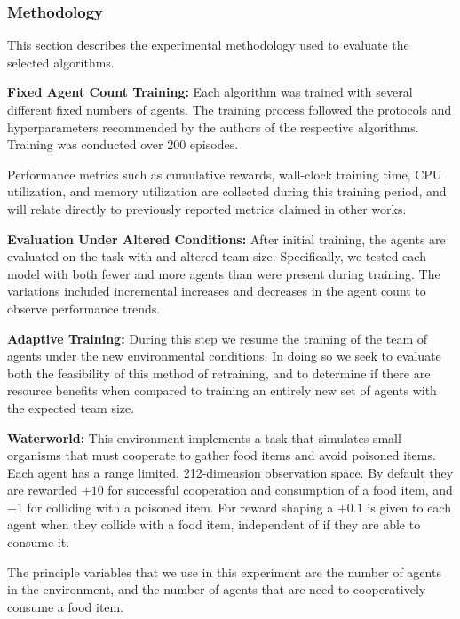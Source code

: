 \subsubsection*{Methodology}

This section describes the experimental methodology used to
evaluate the selected algorithms. 

\phantom{\hfil} %

\textbf{Fixed Agent Count Training:}
Each algorithm was trained with several different fixed numbers of agents. 
The training process followed the protocols and hyperparameters 
recommended by the authors of the respective algorithms. 
Training was conducted over 200 episodes.

Performance metrics such as cumulative rewards, wall-clock training time,
CPU utilization, and memory utilization are collected during this training
period, and will relate directly to previously reported metrics claimed
in other works.

\textbf{Evaluation Under Altered Conditions:}
After initial training, the agents are evaluated on the task with
and altered team size. Specifically, we tested each model with both 
fewer and more agents than were present during training. 
The variations included incremental increases and decreases in the 
agent count to observe performance trends.

\textbf{Adaptive Training:}
During this step we resume the training of the team of agents
under the new environmental conditions.
In doing so we seek to evaluate both the feasibility of this
method of retraining, and to determine if there are resource benefits
when compared to training an entirely new set of agents with the 
expected team size.

\phantom{\hfil} %

\textbf{Waterworld:}
This environment implements a task that simulates small organisms
that must cooperate to gather food items and avoid poisoned items.
Each agent has a range limited, 212-dimension observation space.
By default they are rewarded \(+10\) for successful cooperation and 
consumption of a food item, and \(-1\) for colliding with a poisoned
item. For reward shaping a \(+0.1\) is given to each agent when they 
collide with a food item, independent of if they are able to consume it.

The principle variables that we use in this experiment are the number of
agents in the environment, and the number of agents that are need to 
cooperatively consume a food item.

